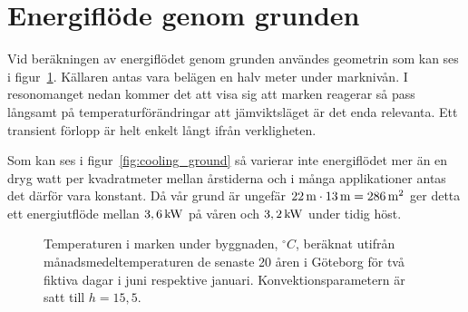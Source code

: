 \section{Energiflöde genom grunden}

% 
% 

Vid beräkningen av energiflödet genom grunden användes geometrin som kan ses i figur~\ref{fig:groundheat}. Källaren antas vara belägen en halv meter under marknivån. I resonomanget nedan kommer det att visa sig att marken reagerar så pass långsamt på temperaturförändringar att jämviktsläget är det enda relevanta. Ett transient förlopp är helt enkelt långt ifrån verkligheten.

Som kan ses i figur~\ref{fig:cooling_ground} så varierar inte energiflödet mer än en dryg watt per kvadratmeter mellan årstiderna och i många applikationer antas det därför vara konstant. Då vår grund är ungefär $\unit[22]{m}\cdot\unit[13]{m}=\unit[286]{m^2}$ ger detta ett energiutflöde mellan $\unit[3,6]{kW}$ på våren och $\unit[3,2]{kW}$ under tidig höst. 

\begin{figure}
\centering
{}
\caption{\label{fig:groundheat}
Temperaturen i marken under byggnaden, $\unit{^\circ C}$, beräknat utifrån månadsmedeltemperaturen de senaste 20 åren i Göteborg för två fiktiva dagar i juni respektive januari. Konvektionsparametern är satt till $h=15,5$. }
\end{figure}


